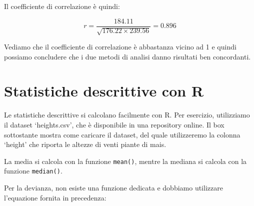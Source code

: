 \documentclass[
  12pt,
]{book}
\newenvironment{Shaded}{\begin{snugshade}}{\end{snugshade}}
\newcommand{\AttributeTok}[1]{\textcolor[rgb]{0.77,0.63,0.00}{#1}}
\newcommand{\DecValTok}[1]{\textcolor[rgb]{0.00,0.00,0.81}{#1}}
\newcommand{\DocumentationTok}[1]{\textcolor[rgb]{0.56,0.35,0.01}{\textbf{\textit{#1}}}}
\newcommand{\FunctionTok}[1]{\textcolor[rgb]{0.00,0.00,0.00}{#1}}
\newcommand{\NormalTok}[1]{#1}
\newcommand{\OtherTok}[1]{\textcolor[rgb]{0.56,0.35,0.01}{#1}}
\newcommand{\SpecialCharTok}[1]{\textcolor[rgb]{0.00,0.00,0.00}{#1}}
\newcommand{\StringTok}[1]{\textcolor[rgb]{0.31,0.60,0.02}{#1}}
\begin{document}
Il coefficiente di correlazione è quindi:

\[r = \frac{184.11}{\sqrt{176.22 \times 239.56}} = 0.896\]

Vediamo che il coefficiente di correlazione è abbastanza vicino ad 1 e quindi possiamo concludere che i due metodi di analisi danno risultati ben concordanti.

\hypertarget{statistiche-descrittive-con-r}{%
\section{Statistiche descrittive con R}\label{statistiche-descrittive-con-r}}

Le statistiche descrittive si calcolano facilmente con R. Per esercizio, utilizziamo il dataset `heights.csv', che è disponibile in una repository online. Il box sottostante mostra come caricare il dataset, del quale utilizzeremo la colonna `height' che riporta le altezze di venti piante di mais.

\begin{Shaded}
\end{Shaded}

La media si calcola con la funzione \texttt{mean()}, mentre la mediana si calcola con la funzione \texttt{median()}.

\begin{Shaded}
\end{Shaded}

Per la devianza, non esiste una funzione dedicata e dobbiamo utilizzare l'equazione fornita in precedenza:

\begin{Shaded}
\end{Shaded}
\end{document}

